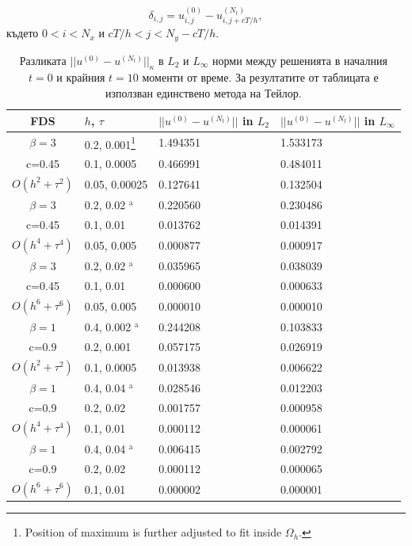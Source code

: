 \documentclass{article}
\newcommand{\be}{\begin{equation}}
\newcommand{\ee}{\end{equation}}
\theoremstyle{remark}
\begin{document}
\be\label{st_end_diff}
 \delta_{i,j} = u_{i,j}^{(0)} - u_{i,j+cT/h}^{(N_t)},
\ee
където $0 < i < N_x$ и $cT/h < j < N_y - cT/h$. 
\begin{table}[ht]
\centering
\small
		\begin{tabular}{||c|l|l|l||}
			\hline
			\hline
      FDS        & $h$, $\tau$  & $||u^{(0)} - u^{(N_t)}||$ in $L_2$  & $||u^{(0)} - u^{(N_t)}||$ in $L_\infty$   \\
   		\hline 
			\hline
  $\beta=3$                &0.2, 0.001\footnote{Position of maximum is further adjusted to fit inside $\Omega_h$.}            & 1.494351 & 1.533173    \\
   c=0.45                     &0.1, 0.0005          & 0.466991 & 0.484011       \\
     $O(h^2 + \tau^ 2)$ &0.05, 0.00025   & 0.127641 & 0.132504      \\
			\hline 
  $\beta=3$               &0.2, 0.02 $^{\text{a}}$      &0.220560 & 0.230486       \\
   c=0.45                    &0.1, 0.01      &0.013762 & 0.014391        \\
     $O(h^4+ \tau^4)$ &0.05, 0.005&0.000877 & 0.000917         \\
			\hline 
  $\beta=3$               &0.2, 0.02 $^{\text{a}}$       &  0.035965 & 0.038039        \\
     c=0.45                 &0.1, 0.01        &0.000600 & 0.000633       \\
     $O(h^6+ \tau^6)$ &0.05, 0.005 &0.000010 & 0.000010          \\
	   \hline
			\hline 
       $\beta=1$       &0.4, 0.002 $^{\text{a}}$       & 0.244208 & 0.103833 \\
                  c=0.9    &0.2, 0.001       &  0.057175 & 0.026919  \\
  $O(h^2+ \tau^2)$ &0.1, 0.0005   & 0.013938 & 0.006622  \\
			\hline
      $\beta=1$               &0.4, 0.04 $^{\text{a}}$    &0.028546 & 0.012203 \\
       c=0.9                     &0.2, 0.02     & 0.001757 & 0.000958     \\
       $O(h^4+ \tau^4)$ &0.1, 0.01   & 0.000112 & 0.000061   \\
    \hline
  $\beta=1$                  &0.4, 0.04 $^{\text{a}}$   &0.006415 & 0.002792  \\
      c=0.9                    &0.2, 0.02   &0.000112 & 0.000065     \\
     $O(h^6+ \tau^6)$ &0.1, 0.01 & 0.000002 & 0.000001         \\
	   \hline
			\hline 
		\end{tabular}
		\caption{Разликата $||u^{(0)} - u^{(N_t)}||_\kappa$ в $L_2$ и $L_\infty$ норми между решенията в началния $t=0$ и крайния $t=10$ моменти от време. За резултатите от таблицата е използван единствено метода на Тейлор.}
\label{tableG}
\end{table}
\end{document}
